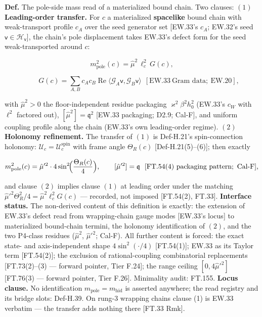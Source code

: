 \begin{definition}\label{tag:Def-H-37}
\textbf{Def.} The pole-side mass read of a materialized bound chain. Two clauses: $(1)$ \textbf{Leading-order transfer.} For $c$ a materialized \textbf{spacelike} bound chain with weak-transport profile $c_A$ over the seed generator set [EW.33's $c_A$; EW.32's seed $\mathsf v\in\mathcal H_{\mathsf v}$], the chain's pole displacement takes EW.33's defect form for the seed weak-transported around $c$:

\[
m^2_{\mathrm{pole}}(c)=\hat\mu^2\,\ell_c^2\,G(c),
\]

\[
\qquad G(c)=\sum_{A,B}c_Ac_B\operatorname{Re}\langle\mathcal G_A\mathsf v,\mathcal G_B\mathsf v\rangle\ \ [\mathrm{EW.33}\ \text{Gram data};\ \mathrm{EW.20}],
\]

with $\hat\mu^2>0$ the floor-independent residue packaging $\varkappa^2\beta^2h_0^2$ (EW.33's $c_W$ with $\ell^2$ factored out), $[\hat\mu^2]=\mathfrak q^2$ [EW.33 packaging; D2.9; Cal-F], and uniform coupling profile along the chain (EW.33's own leading-order regime). $(2)$ \textbf{Holonomy refinement.} The transfer of $(1)$ is Def-H.21's spin-connection holonomy: $\mathcal U_c=\mathcal U^{\mathrm{spin}}_c$ with frame angle $\Theta_R(c)$ [Def-H.21(5)–(6)]; then exactly

\[
m^2_{\mathrm{pole}}(c)=\hat\mu'^2\cdot4\sin^2\!\Bigl(\frac{\Theta_R(c)}{4}\Bigr),\qquad[\hat\mu'^2]=\mathfrak q\ \ [\mathrm{FT.54}(4)\ \text{packaging pattern};\ \text{Cal-F}],
\]

and clause $(2)$ implies clause $(1)$ at leading order under the matching $\hat\mu'^2\Theta_R^2/4=\hat\mu^2\ell_c^2G(c)$ — recorded, not imposed [FT.54(2), FT.33]. \textbf{Interface status.} The non-derived content of this definition is exactly: the extension of EW.33's defect read from wrapping-chain gauge modes [EW.33's locus] to materialized bound-chain termini, the holonomy identification of $(2)$, and the two P4-class residues ($\hat\mu^2$, $\hat\mu'^2$; Cal-F). All further content is forced: the exact state- and axis-independent shape $4\sin^2(\cdot/4)$ [FT.54(1)]; EW.33 as its Taylor term [FT.54(2)]; the exclusion of rational-coupling combinatorial replacements [FT.73(2)–(3) — forward pointer, Tier F.24]; the range ceiling $[0,4\hat\mu'^2]$ [FT.76(3) — forward pointer, Tier F.26]. Minimality audit: FT.155. \textbf{Locus clause.} No identification $m_{\mathrm{pole}}=m_{\mathrm{hid}}$ is asserted anywhere; the read registry and its bridge slots: Def-H.39. On rung-3 wrapping chains clause (1) is EW.33 verbatim — the transfer adds nothing there [FT.33 Rmk].

\end{definition}

